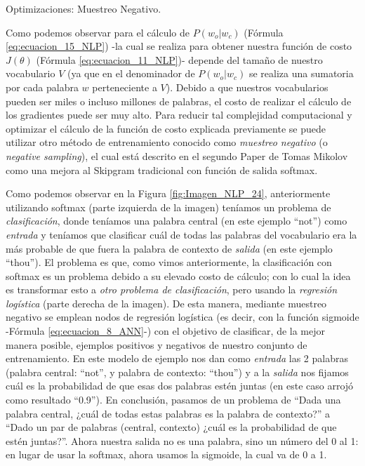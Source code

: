 \documentclass[12pt,a4paper]{article}
\makeatletter
\renewcommand\paragraph{\@startsection{paragraph}{4}{\z@}
            {-2.5ex\@plus -1ex \@minus -.25ex}
            {1.25ex \@plus .25ex}
            {\normalfont\normalsize\bfseries}}
\makeatother
\begin{document}
\begin{sloppypar}
\paragraph{Optimizaciones: Muestreo Negativo.}\label{neg_samp}

Como podemos observar para el cálculo de $P(w_o | w_c)$ (Fórmula \ref{eq:ecuacion_15_NLP}) -la cual se realiza para obtener nuestra función de costo $J(\theta)$ (Fórmula \ref{eq:ecuacion_11_NLP})- depende del tamaño de nuestro vocabulario $V$ (ya que en el denominador de $P(w_o | w_c)$ se realiza una sumatoria por cada palabra $w$ perteneciente a $V$). Debido a que nuestros vocabularios pueden ser miles o incluso millones de palabras, el costo de realizar el cálculo de los gradientes puede ser muy alto. Para reducir tal complejidad computacional y optimizar el cálculo de la función de costo explicada previamente se puede utilizar otro método de entrenamiento conocido como \textit{muestreo negativo} (o \textit{negative sampling}), el cual está descrito en el segundo Paper de Tomas Mikolov\cite{NLP_14} como una mejora al Skipgram tradicional con función de salida softmax.

Como podemos observar en la Figura \ref{fig:Imagen_NLP_24}, anteriormente utilizando softmax (parte izquierda de la imagen) teníamos un problema de \textit{clasificación}, donde teníamos una palabra central (en este ejemplo “not”) como \textit{entrada} y teníamos que clasificar cuál de todas las palabras del vocabulario era la más probable de que fuera la palabra de contexto de \textit{salida} (en este ejemplo “thou”). El problema es que, como vimos anteriormente, la clasificación con softmax es un problema debido a su elevado costo de cálculo; con lo cual la idea es transformar esto a \textit{otro problema de clasificación}, pero usando la \textit{regresión logística} (parte derecha de la imagen). De esta manera, mediante muestreo negativo se emplean nodos de regresión logística (es decir, con la función sigmoide -Fórmula \ref{eq:ecuacion_8_ANN}-) con el objetivo de clasificar, de la mejor manera posible, ejemplos positivos y negativos de nuestro conjunto de entrenamiento\cite{NLP_13_2}. En este modelo de ejemplo nos dan como \textit{entrada} las 2 palabras (palabra central: “not”, y palabra de contexto: “thou”) y a la \textit{salida} nos fijamos cuál es la probabilidad de que esas dos palabras estén juntas (en este caso arrojó como resultado “0.9”). En conclusión, pasamos de un problema de “Dada una palabra central, ¿cuál de todas estas palabras es la palabra de contexto?” a “Dado un par de palabras (central, contexto) ¿cuál es la probabilidad de que estén juntas?”. Ahora nuestra salida no es una palabra, sino un número del 0 al 1: en lugar de usar la softmax, ahora usamos la sigmoide, la cual va de 0 a 1. \\


\end{sloppypar}
\end{document}
